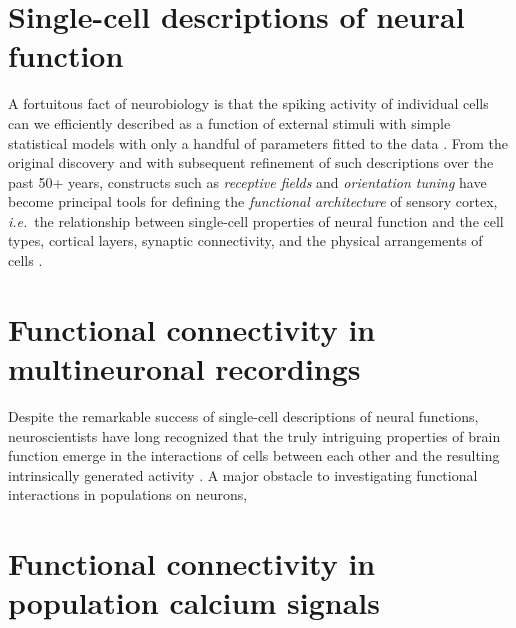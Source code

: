 \section{Single-cell descriptions of neural function}
A fortuitous fact of neurobiology is that the spiking activity of individual cells can we efficiently described as a function of external stimuli with simple statistical models with only a handful of parameters fitted to the data \citep{Carandini:2005}. From the original discovery and with subsequent refinement of such descriptions over the past 50+ years, constructs such as \emph{receptive fields} and \emph{orientation tuning} have become principal tools for defining the \emph{functional architecture} of sensory cortex, \emph{i.e.}\ the relationship between single-cell properties of neural function and the cell types, cortical layers, synaptic connectivity, and the physical arrangements of cells  \citep{Hubel:1962,Ohki:2005,Reid:2012}.

\section{Functional connectivity in multineuronal recordings}
Despite the remarkable success of single-cell descriptions of neural functions, neuroscientists have long recognized that the truly intriguing properties of brain function emerge in the interactions of cells between each other and the resulting intrinsically generated activity \citep{Yuste:2005}.  A major obstacle to investigating functional interactions in populations on neurons, 

\section{Functional connectivity in population calcium signals}
